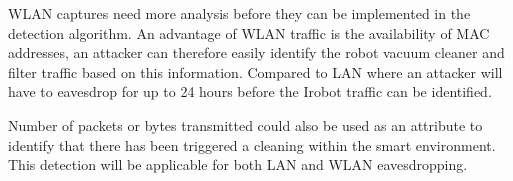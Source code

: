WLAN captures need more analysis before they can be implemented in the detection algorithm. An advantage of WLAN traffic is the availability of MAC addresses, an attacker can therefore easily identify the robot vacuum cleaner and filter traffic based on this information. Compared to LAN where an attacker will have to eavesdrop for up to 24 hours before the Irobot traffic can be identified. 

Number of packets or bytes transmitted could also be used as an attribute to identify that there has been triggered a cleaning within the smart environment. This detection will be applicable for both LAN and WLAN eavesdropping.  
